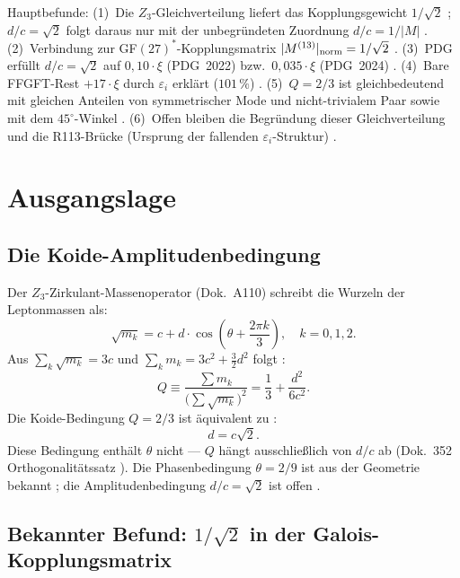 Hauptbefunde: (1)~Die $Z_3$-Gleichverteilung liefert das Kopplungsgewicht
$1/\sqrt{2}$ \BM; $d/c = \sqrt{2}$ folgt daraus nur mit der unbegründeten
Zuordnung $d/c = 1/|M|$ \SM.
(2)~Verbindung zur GF$(27)^*$-Kopplungsmatrix $|M^{(13)}|_{\rm norm} = 1/\sqrt{2}$ \BM.
(3)~PDG erfüllt $d/c = \sqrt{2}$ auf $0{,}10\cdot\xi$ (PDG~2022) bzw.\ $0{,}035\cdot\xi$ (PDG~2024) \KM.
(4)~Bare FFGFT-Rest $+17\cdot\xi$ durch $\varepsilon_i$ erklärt ($101\,\%$) \KM.
(5)~$Q = 2/3$ ist gleichbedeutend mit gleichen Anteilen von symmetrischer Mode
und nicht-trivialem Paar sowie mit dem $45^\circ$-Winkel \BM.
(6)~Offen bleiben die Begründung dieser Gleichverteilung und die R113-Brücke
(Ursprung der fallenden $\varepsilon_i$-Struktur) \SM.

\section{Ausgangslage}

\subsection*{Die Koide-Amplitudenbedingung}

Der $Z_3$-Zirkulant-Massenoperator (Dok.~A110) schreibt die Wurzeln
der Leptonmassen als:
\begin{equation}
  \sqrt{m_k} = c + d\cdot\cos\!\left(\theta + \frac{2\pi k}{3}\right),
  \quad k = 0,1,2.
  \label{eq:zirk}
\end{equation}
Aus $\sum_k \sqrt{m_k} = 3c$ und $\sum_k m_k = 3c^2 + \tfrac{3}{2}d^2$ folgt \BM:
\begin{equation}
  Q \equiv \frac{\sum m_k}{\bigl(\sum\sqrt{m_k}\bigr)^2}
  = \frac{1}{3} + \frac{d^2}{6c^2}.
  \label{eq:Q}
\end{equation}
Die Koide-Bedingung $Q = 2/3$ ist äquivalent zu \BM:
\begin{equation}
  \boxed{d = c\sqrt{2}.}
  \label{eq:bed}
\end{equation}
Diese Bedingung enthält $\theta$ nicht --- $Q$ hängt ausschließlich
von $d/c$ ab (Dok.~352 Orthogonalitätssatz \BM).
Die Phasenbedingung $\theta = 2/9$ ist aus der Geometrie bekannt \KM;
die Amplitudenbedingung $d/c = \sqrt{2}$ ist offen \SM.

\subsection*{Bekannter Befund: $1/\sqrt{2}$ in der Galois-Kopplungsmatrix}

